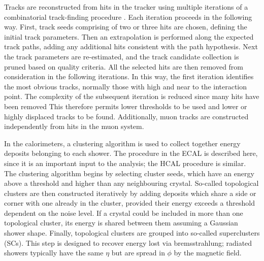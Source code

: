 Tracks are reconstructed from hits in the tracker using multiple iterations of a combinatorial track-finding procedure \cite{TrackReco}.
Each iteration proceeds in the following way.
First, track seeds comprising of two or three hits are chosen, defining the initial track parameters.
Then an extrapolation is performed along the expected track paths, adding any additional hits consistent with the path hypothesis.
Next the track parameters are re-estimated, and the track candidate collection is pruned based on quality criteria.
All the selected hits are then removed from consideration in the following iterations.
In this way, the first iteration identifies the most obvious tracks, normally those with high \pt and near to the interaction point.
The complexity of the subsequent iteration is reduced since many hits have been removed
This therefore permits lower thresholds to be used and lower \pt or highly displaced tracks to be found.
Additionally, muon tracks are constructed independently from hits in the muon system.

In the calorimeters, a clustering algorithm is used to collect together energy deposits belonging to each shower. %
The procedure in the ECAL is described here, since it is an important input to the \Hgg analysis; the HCAL procedure is similar.
The clustering algorithm begins by selecting cluster seeds, which have an energy above a threshold and higher than any neighbouring crystal.
So-called topological clusters are then constructed iteratively by adding deposits which share a side or corner with one already in the cluster, 
provided their energy exceeds a threshold dependent on the noise level. %
If a crystal could be included in more than one topological cluster, its energy is shared between them assuming a Gaussian shower shape.
Finally, topological clusters are grouped into so-called superclusters (SCs).
This step is designed to recover energy lost via bremsstrahlung; 
radiated showers typically have the same $\eta$ but are spread in $\phi$ by the magnetic field.

